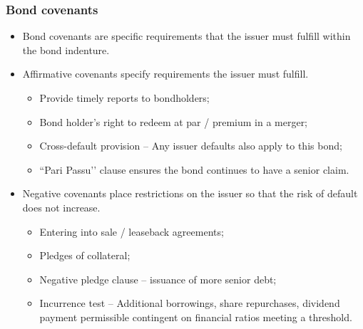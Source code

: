 \documentclass[../notes_compiled.tex]{subfiles}
\begin{document}
\subsubsection{Bond covenants}
\begin{itemize}
\item Bond covenants are specific requirements that the issuer must fulfill within the bond indenture.
\item Affirmative covenants specify requirements the issuer must fulfill.
\begin{itemize}
\item Provide timely reports to bondholders;
\item Bond holder’s right to redeem at par / premium in a merger;
\item Cross-default provision -- Any issuer defaults also apply to this bond;
\item ``Pari Passu’’ clause ensures the bond continues to have a senior claim.
\end{itemize}
\item Negative covenants place restrictions on the issuer so that the risk of default does not increase.
\begin{itemize}
\item Entering into sale / leaseback agreements;
\item Pledges of collateral;
\item Negative pledge clause -- issuance of more senior debt;
\item Incurrence test -- Additional borrowings, share repurchases, dividend payment permissible contingent on financial ratios meeting a threshold.
\end{itemize}
\end{itemize}
\end{document}
